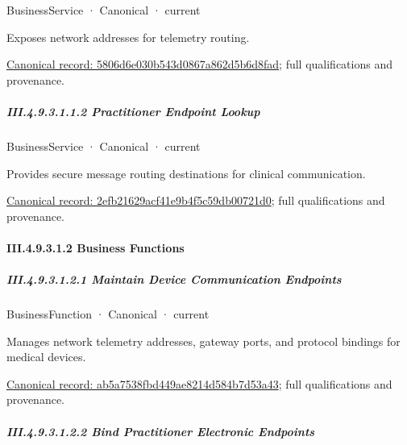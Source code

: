 \label{element:5806d6e030b543d0867a862d5b6d8fad}
{\small BusinessService · Canonical · current}\par

Exposes network addresses for telemetry routing.


{\footnotesize \href{../../../../../../../continuum/business/business-service/5806d6e030b543d0867a862d5b6d8fad.md}{Canonical record: 5806d6e030b543d0867a862d5b6d8fad}; full qualifications and provenance.}\par
\subparagraph*{III.4.9.3.1.1.2 Practitioner Endpoint Lookup}
\label{navigation:III.4.9.3.1.1.2}

\label{element:2efb21629acf41e9b4f5c59db00721d0}
{\small BusinessService · Canonical · current}\par

Provides secure message routing destinations for clinical communication.


{\footnotesize \href{../../../../../../../continuum/business/business-service/2efb21629acf41e9b4f5c59db00721d0.md}{Canonical record: 2efb21629acf41e9b4f5c59db00721d0}; full qualifications and provenance.}\par
\paragraph*{III.4.9.3.1.2 Business Functions}
\label{navigation:III.4.9.3.1.2}

\subparagraph*{III.4.9.3.1.2.1 Maintain Device Communication Endpoints}
\label{navigation:III.4.9.3.1.2.1}

\label{element:ab5a7538fbd449ae8214d584b7d53a43}
{\small BusinessFunction · Canonical · current}\par

Manages network telemetry addresses, gateway ports, and protocol bindings for medical devices.


{\footnotesize \href{../../../../../../../continuum/business/business-function/ab5a7538fbd449ae8214d584b7d53a43.md}{Canonical record: ab5a7538fbd449ae8214d584b7d53a43}; full qualifications and provenance.}\par
\subparagraph*{III.4.9.3.1.2.2 Bind Practitioner Electronic Endpoints}
\label{navigation:III.4.9.3.1.2.2}

